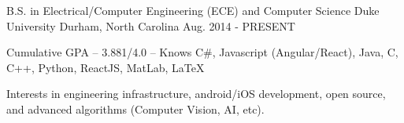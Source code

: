 \begin{cventries}
  \cventry
    {B.S. in Electrical/Computer Engineering (ECE) and Computer Science}
    {Duke University}
    {Durham, North Carolina}
    {Aug. 2014 - PRESENT}
    {
      \begin{cvitems}
        \item {Cumulative GPA -- 3.881/4.0 -- Knows C\#, Javascript (Angular/React), Java, C, C++, Python, ReactJS, MatLab, LaTeX}
        \item {Interests in engineering infrastructure, android/iOS development, open source, and advanced algorithms (Computer Vision, AI, etc).}
      \end{cvitems}
    }
\end{cventries}
